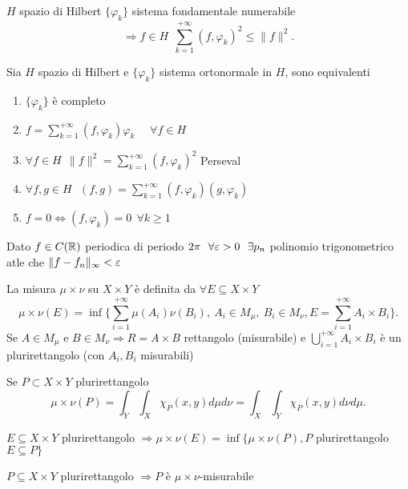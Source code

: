 \documentclass[12px]{article}
\begin{document}
	\begin{coro}
		$H$ spazio  di Hilbert  $\{ \varphi_k \}$ sistema fondamentale numerabile 
		\[
		 \Rightarrow f\in H\ \ \sum^{+\infty}_{k=1}(f, \varphi_k)^2\leq \|f\|^2
	 .\]
	\end{coro}
	\begin{teo}
		Sia $H$ spazio di Hilbert e $\{ \varphi_k\}$ sistema ortonormale in $H$, sono equivalenti
		\begin{enumerate}
			\item $\{ \varphi_k\}$ è completo
			\item $f = \sum^{+\infty }_{k=1}(f, \varphi_k) \varphi_k$ \ \ $\forall f \in H$
			\item  $\forall f \in H \ \ \|f\|^2 = \sum^{+\infty}_{k=1} (f, \varphi_k)^2 $ Perseval
			\item $\forall f,g\in H  \ \ \ (f,g) = \sum^{+\infty}_{k=1}(f, \varphi_k)(g, \varphi_k)$
			\item $f =0 \Leftrightarrow (f, \varphi_k) = 0 \ \ \forall k\geq 1$
		\end{enumerate}
	\end{teo}
	\begin{teo}[Weierstrass]
		Dato $f\in C(\mathbb{R})$ periodica di periodo  $2\pi\ \ \forall \varepsilon > 0 \ \ \exists p_n$ polinomio trigonometrico atle che  $\|f-f_n\|_\infty< \varepsilon$
	\end{teo}
	\begin{defi}
		 La misura $\mu\times\nu$ su  $X\times Y$ è definita da  $\forall E\subseteq X\times Y$
		  \[
			  \mu\times\nu (E) = \inf\{ \sum^{+\infty}_{i=1}\mu(A_i)\nu(B_i), \ A_i\in M_\mu, \ B_i\in M_\nu, E = \sum^{+\infty}_{i=1}A_i\times B_i\}
		 .\] 
		 Se $A\in M_\mu$ e $B\in M_\nu \Rightarrow  R = A\times B$ rettangolo (misurabile) e $ \bigcup^{+\infty}_{i =1}A_i\times B_i$ è un plurirettangolo (con $A_i, B_i$ misurabili)
	\end{defi}
	\begin{prop}
		Se $P\subset X\times Y$ plurirettangolo
		 \[
		\mu\times\nu(P) = \int_Y\int_X\chi_P(x,y)d\mu d\nu = \int_X\int_Y\chi_P(x,y)d\nu d\mu
		.\] 
	\end{prop}
	\begin{lemm}
		$E\subseteq X\times Y$ plurirettangolo  $ \Rightarrow  \mu\times\nu (E) = \inf\{\mu\times\nu(P), P$ plurirettangolo $E\subseteq P\}$
	\end{lemm}
	\begin{prop}
		$P\subseteq X\times Y$ plurirettangolo $ \Rightarrow  P$ è $\mu\times \nu$-misurabile
	\end{prop}
\end{document}
